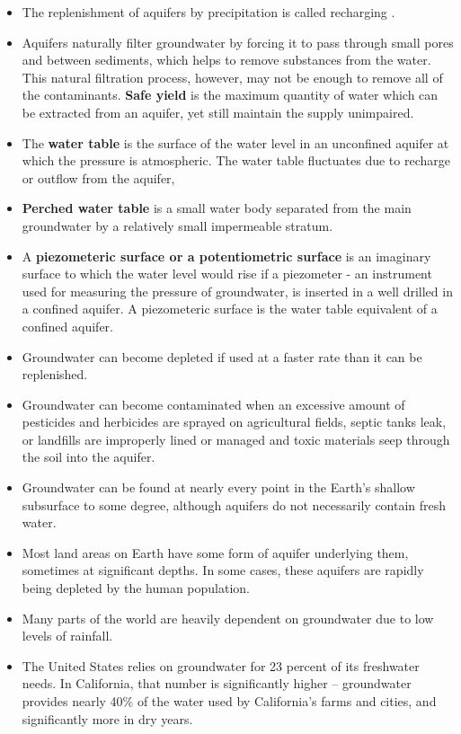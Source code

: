 \begin{itemize}
\item The replenishment of aquifers by precipitation is called recharging . 
\item Aquifers naturally filter groundwater by forcing it to pass through small pores and between sediments, which helps to remove substances from the water. This natural filtration process, however, may not be enough to remove all of the contaminants.
\textbf{Safe yield}  is the maximum quantity of water which can be extracted from an aquifer, yet still maintain the supply unimpaired.
\item The \textbf{water table} is the surface of the water level in an unconfined aquifer at which the pressure is atmospheric.  The water table fluctuates due to recharge or outflow from the aquifer,
\item \textbf{Perched water table} is a small water body separated from the main groundwater by a relatively small impermeable stratum.
\item A \textbf{piezometeric surface or a potentiometric surface} is an imaginary surface to which the water level would rise if a piezometer - an  instrument used for measuring the pressure of groundwater, is inserted in a well drilled in a confined aquifer.  A piezometeric surface is the water table equivalent of a confined aquifer.
\item Groundwater can become depleted if used at a faster rate than it can be replenished. 
\item Groundwater can become contaminated when an excessive amount of pesticides and herbicides are sprayed on agricultural fields, septic tanks leak, or landfills are improperly lined or managed and toxic materials seep through the soil into the aquifer.
\item Groundwater can be found at nearly every point in the Earth's shallow subsurface to some degree, although aquifers do not necessarily contain fresh water.
\item Most land areas on Earth have some form of aquifer underlying them, sometimes at significant depths. In some cases, these aquifers are rapidly being depleted by the human population.
\item Many parts of the world are heavily dependent on groundwater due to low levels of rainfall.
\item The United States relies on groundwater for 23 percent of its freshwater needs.  In California, that number is significantly higher – groundwater provides nearly 40\% of the water used by California’s farms and cities, and significantly more in dry years.
\end{itemize}

